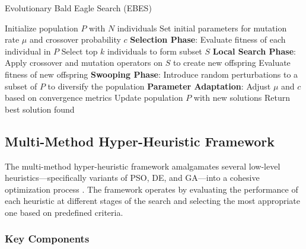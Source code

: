 \documentclass[conference]
{IEEEtran}
\begin{document}
\begin{algorithm}[H]
\caption{Evolutionary Bald Eagle Search (EBES)}
\label{alg:ebes}
\begin{algorithmic}[1]
\STATE Initialize population $P$ with $N$ individuals
\STATE Set initial parameters for mutation rate $\mu$ and crossover probability $c$
    \STATE \textbf{Selection Phase}:
    \STATE Evaluate fitness of each individual in $P$
    \STATE Select top $k$ individuals to form subset $S$
    \STATE \textbf{Local Search Phase}:
    \STATE Apply crossover and mutation operators on $S$ to create new offspring
    \STATE Evaluate fitness of new offspring
    \STATE \textbf{Swooping Phase}:
    \STATE Introduce random perturbations to a subset of $P$ to diversify the population
    \STATE \textbf{Parameter Adaptation}:
    \STATE Adjust $\mu$ and $c$ based on convergence metrics
    \STATE Update population $P$ with new solutions
\ENDFOR
\STATE Return best solution found
\end{algorithmic}
\end{algorithm}

\subsection{Multi-Method Hyper-Heuristic Framework}

The multi-method hyper-heuristic framework amalgamates several low-level heuristics—specifically variants of PSO, DE, and GA—into a cohesive optimization process \cite{grobler2010alternative}. The framework operates by evaluating the performance of each heuristic at different stages of the search and selecting the most appropriate one based on predefined criteria.

\subsubsection{Key Components}
\end{document}
